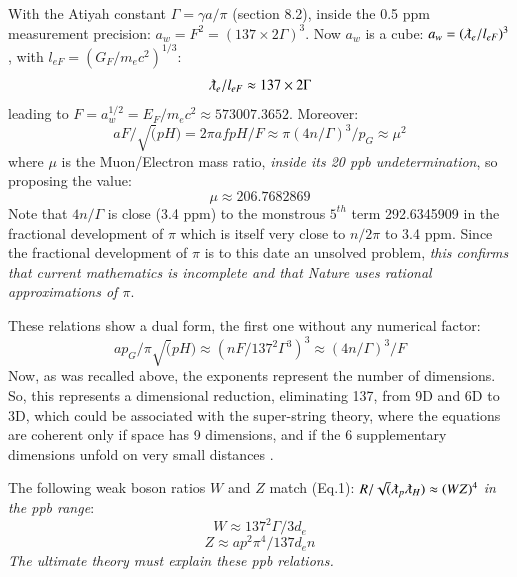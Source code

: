 \documentclass[twoside,draft]{article}
\begin{document}
\begin{sloppypar}
 With the Atiyah constant $\Gamma = \gamma a/\pi$ (section 8.2), inside the 0.5 ppm measurement precision:  
 $a_{w} = F^2 = (137 \times 2 \Gamma)^{3}$. Now $a_{w}$ is a cube: $a_{w} = (\lambdabar_{e}/l_{eF})^{3}$, with $l_{eF} = (G_{F}/m_{e} c^{2})^{1/3}$:    
\begin{equation}
\lambdabar_e/l_{eF} \approx 137 \times 2\Gamma
\end{equation}
leading to $F = a_{w}^{1/2} = E_{F} /m_{e} c^{2} \approx 573007.3652$. Moreover:
\begin{equation}
aF/\sqrt(pH) = 2\pi afpH/F \approx \pi(4n/\Gamma)^3/p_G \approx \mu^2
\end{equation}
where $\mu$ is the Muon/Electron mass ratio, \textit{inside its 20 ppb undetermination}, so proposing the value:
\begin{equation}
\mu \approx 206.7682869
\end{equation}
Note that $4n/\Gamma$ is close (3.4 ppm) to the monstrous $5^{th}$ term 292.6345909 in
the fractional development of $\pi$ which is itself very close to $n/2\pi$ to 3.4 ppm. Since the fractional
development of $\pi$ is to this date an unsolved problem, \textit{this confirms that current mathematics is
incomplete and that Nature uses rational approximations of $\pi$}.

These relations show a dual form, the first one without any numerical factor:
\begin{equation}
ap_{G} / \pi \sqrt(pH) \approx (n F/137^{2} \Gamma^{3} )^{3} \approx (4n/ \Gamma)^{3}/F
\end{equation}
Now,
 as was recalled above, the exponents represent the number of
dimensions. So, this represents a dimensional reduction, eliminating 137, from 9D and 6D to
3D, which could be associated with the super-string theory, where the equations are coherent only if space
has 9 dimensions, and if the 6 supplementary dimensions unfold on very small distances \cite{Polchinski}.


The following weak boson ratios $W$ and $Z$ match (Eq.1):
$R/\sqrt(\lambdabar_{p} \lambdabar_{H} ) \approx (WZ)^{4}$
\textit{in the ppb range}: 
\begin{equation}
W \approx 137^{2} \Gamma / 3d_{e}
\end{equation}
\begin{equation}
Z \approx ap^{2} \pi^{4} / 137 d_{e} n
\end{equation}
\textit{The ultimate theory must explain these ppb relations.}



\end{sloppypar}
\end{document}
